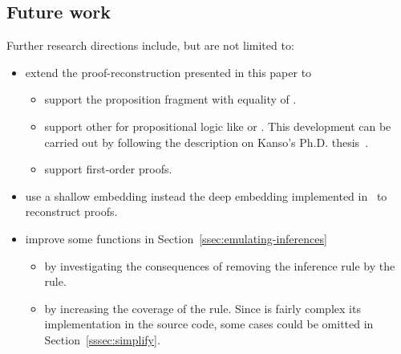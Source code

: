 \documentclass[../main.tex]{subfiles}
\begin{document}
\subsection*{Future work}

Further research directions include, but are not limited to:

\begin{itemize}
\item extend the proof-reconstruction presented in this paper to
  \begin{itemize}
    \item support the proposition fragment with equality of \Metis.
    \item support other \ATPs for propositional logic like  or . This development can be carried out by following the 
description on Kanso's Ph.D. thesis~\cite{Kanso2012}.
    \item support \Metis first-order proofs.
  \end{itemize}

\item use a shallow embedding instead the deep embedding
implemented in~\cite{AgdaProp} to reconstruct proofs.
\item improve some functions in Section~\ref{ssec:emulating-inferences}
\begin{itemize}
  \item by investigating the consequences of removing the \clausify
inference rule by the \canonicalize rule.
  \item by increasing the coverage of the \simplify rule. Since is fairly
complex its implementation in the \Metis source code, some cases could be omitted in Section~\ref{sssec:simplify}.
\end{itemize}


\end{itemize}
\end{document}
